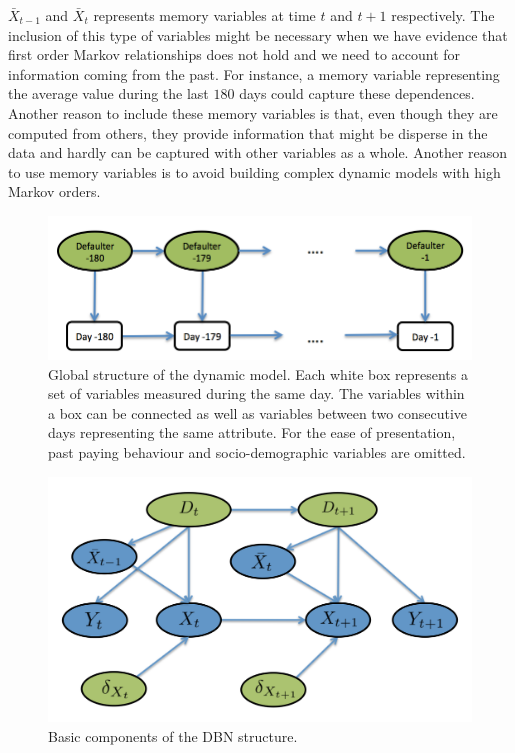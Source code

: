 $\bar{X}_{t-1}$ and $\bar{X}_{t}$ represents memory variables at time $t$ and $t+1$ respectively. The inclusion of this type of variables might be necessary when we have evidence that first order Markov relationships does not hold and we need to account for information coming from the past. For instance, a memory variable representing the average value during the last $180$ days could capture these dependences. Another reason to include these memory variables is that, even though they are computed from others, they provide information that might be disperse in the data and hardly can be captured with other variables as a whole. Another reason to use memory variables is to avoid building complex dynamic models with high Markov orders.

\begin{figure}[htbp]
\begin{center}
\includegraphics[scale=0.45]{./figures/CajaMarModel1}
\caption{Global structure of the dynamic model. Each white box represents a set of variables measured during the same day. The variables within a box can be connected as well as variables between two consecutive days representing the same attribute. For the ease of presentation, past paying behaviour and socio-demographic variables are omitted.}
\label{fig:global_temp}
\end{center}
\end{figure}


\begin{figure}[htbp]
\begin{center}
\includegraphics[scale=0.45]{./figures/CajaMarModel2}
\caption{Basic components of the DBN structure.}
\label{fig:component}
\end{center}
\end{figure}

